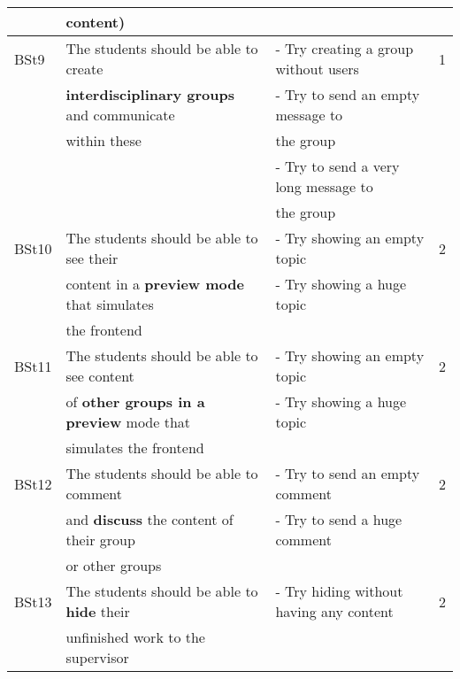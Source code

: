 \documentclass[twoside,openright,fleqn,pointlessnumbers,headinclude,,11pt,a4paper,BCOR5mm,footinclude,cleardoubleempty,abstracton %
                ]{scrreprt}
\begin{document}
\begin{table}[h]
\begin{tabular}{llll}
		&	content)									&	& \\
	\hline
	BSt9 & The students should be able to create 			& - Try creating a group without users  	& 1\\
		& \textbf{interdisciplinary groups} and communicate	& - Try to send an empty message to	& \\
		& within these									& the group	& \\
		& 											& - Try to send a very long message to	& \\
		& 											& the group	& \\
	\hline
	BSt10& The students should be able to see their 			& - Try showing an empty topic 	& 2\\
		& content in a \textbf{preview mode} that simulates	& - Try showing a huge topic	&	\\
		& the frontend									&	& \\
	\hline
	BSt11& The students should be able to see content 		& -  Try showing an empty topic & 2\\
		& of \textbf{other groups in a preview} mode that 		& - Try showing a huge topic	&	\\
		& simulates the frontend							&	& \\
	\hline
	BSt12& The students should be able to comment  			& - Try to send an empty comment  & 2\\
		& and \textbf{discuss} the content of their group		& - Try to send a huge comment	 & \\
		& or other groups								&	 & \\
	\hline
	BSt13& The students should be able to \textbf{hide} their 	& - Try hiding without having any content & 2\\
		& unfinished work to the supervisor					&	& \\
			\hline
	\end{tabular}
	\label{RequirementsBackendStudent}
	\end{table}
\end{document}
